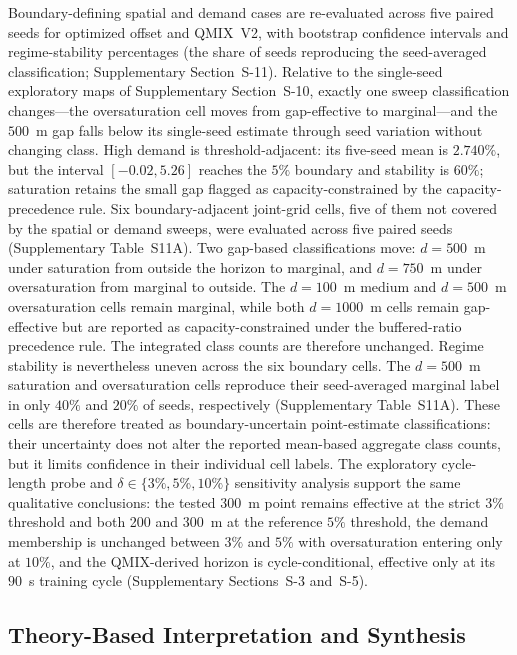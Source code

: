 \documentclass[review,12pt]{elsarticle}
\begin{document}
Boundary-defining spatial and demand cases are re-evaluated across five paired seeds for optimized offset and QMIX~V2, with bootstrap confidence intervals and regime-stability percentages (the share of seeds reproducing the seed-averaged classification; Supplementary Section~S-11). Relative to the single-seed exploratory maps of Supplementary Section~S-10, exactly one sweep classification changes---the oversaturation cell moves from gap-effective to marginal---and the $500$~m gap falls below its single-seed estimate through seed variation without changing class. High demand is threshold-adjacent: its five-seed mean is $2.740\%$, but the interval $[-0.02, 5.26]$ reaches the $5\%$ boundary and stability is $60\%$; saturation retains the small gap flagged as capacity-constrained by the capacity-precedence rule. Six boundary-adjacent joint-grid cells, five of them not covered by the spatial or demand sweeps, were evaluated across five
paired seeds (Supplementary Table~S11A). Two gap-based classifications move:
$d=500$~m under saturation from outside the horizon to marginal, and $d=750$~m
under oversaturation from marginal to outside. The $d=100$~m medium and
$d=500$~m oversaturation cells remain marginal, while both $d=1000$~m cells
remain gap-effective but are reported as capacity-constrained under the
buffered-ratio precedence rule. The integrated class counts are therefore
unchanged. Regime stability is nevertheless uneven across the six boundary
cells. The $d=500$~m saturation and oversaturation cells reproduce their
seed-averaged marginal label in only $40\%$ and $20\%$ of seeds,
respectively (Supplementary Table~S11A). These cells are therefore treated
as boundary-uncertain point-estimate classifications: their uncertainty
does not alter the reported mean-based aggregate class counts, but it limits
confidence in their individual cell labels.
The exploratory cycle-length probe and $\delta\in\{3\%,5\%,10\%\}$ sensitivity analysis support the same qualitative conclusions: the tested 300~m point remains effective at the strict $3\%$ threshold and both 200 and 300~m at the reference $5\%$ threshold, the demand membership is unchanged between $3\%$ and $5\%$ with oversaturation entering only at $10\%$, and the QMIX-derived horizon is cycle-conditional, effective only at its $90$~s training cycle (Supplementary Sections~S-3 and~S-5).

\subsection{Theory-Based Interpretation and Synthesis}
\label{subsec:theory_observed_dchf}
\end{document}
